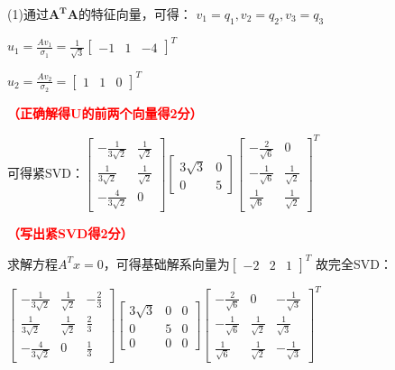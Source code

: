 \documentclass[12pt,a4paper,openany,twoside]{ctexbook}
\begin{document}
\begin{Solution}
	(1)通过$\mathbf{A^T A}$的特征向量，可得：
	$v_1=q_1,v_2=q_2,v_3=q_3$

$u_1=\frac{Av_1}{\sigma_1}=\frac{1}{\sqrt3}\begin{bmatrix}  
-1 & 1 & -4 
\end{bmatrix}^T$

$u_2=\frac{Av_2}{\sigma_2}=\begin{bmatrix}  
1 & 1 & 0
\end{bmatrix}^T$

\hfill \textcolor{red}{\textbf{（正确解得U的前两个向量得2分）}}

可得紧SVD：$\begin{bmatrix}   -\frac{1}{3 \sqrt{2}} &  \frac{1}{\sqrt{2}} \\  \frac{1}{3 \sqrt{2}}  & \frac{1}{\sqrt{2}} \\   -\frac{4}{3 \sqrt{2}} & 0   \end{bmatrix}    \begin{bmatrix}   3 \sqrt{3} & 0 \\   0 & 5   \end{bmatrix}
\begin{bmatrix}   -\frac{2}{ \sqrt{6}} & 0 \\  -\frac{1}{ \sqrt{6}} & \frac{1}{\sqrt{2}}  \\    \frac{1}{ \sqrt{6}} & \frac{1}{\sqrt{2}}   \end{bmatrix}^T$

\hfill \textcolor{red}{\textbf{（写出紧SVD得2分）}}

求解方程$A^Tx=0$，可得基础解系向量为$\begin{bmatrix}  
	-2 & 2 & 1
	\end{bmatrix}^T$ 故完全SVD：

$\begin{bmatrix}   -\frac{1}{3 \sqrt{2}} &  \frac{1}{\sqrt{2}} & -\frac{2}{3} \\  \frac{1}{3 \sqrt{2}}  & \frac{1}{\sqrt{2}} & \frac{2}{3} \\   -\frac{4}{3 \sqrt{2}} & 0 & \frac{1}{3}  \end{bmatrix}    \begin{bmatrix}   3 \sqrt{3} & 0 & 0 \\   0 & 5 &0 \\ 0 & 0& 0  \end{bmatrix}
\begin{bmatrix}   -\frac{2}{ \sqrt{6}} & 0 & -\frac{1}{\sqrt{3}} \\  -\frac{1}{ \sqrt{6}} & \frac{1}{\sqrt{2}} & \frac{1}{\sqrt{3}} \\    \frac{1}{ \sqrt{6}} & \frac{1}{\sqrt{2}}  & -\frac{1}{\sqrt{3}}  \end{bmatrix}^T$


\end{Solution}
\end{document}
